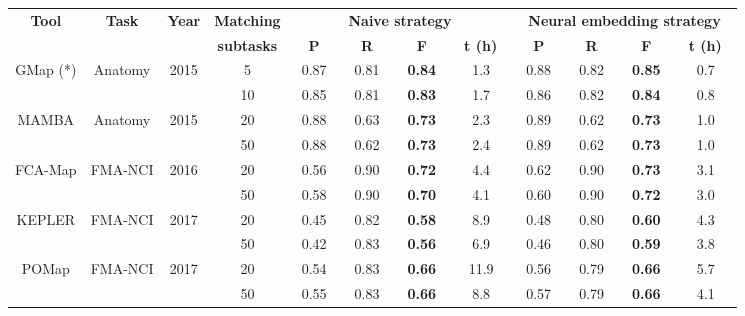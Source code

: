 {
\centering

\begin{scriptsize}
\begin{tabular}{|c|c|c|c||c|c|c|c||c|c|c|c|}
\hline

\multirow{2}{*}{\textbf{Tool}} & \multirow{2}{*}{\textbf{Task}} & 
\multirow{2}{*}{\textbf{Year}}
& 
\textbf{Matching} 
& \multicolumn{4}{c||}{\textbf{Naive
strategy}} & \multicolumn{4}{c|}{\textbf{Neural embedding
strategy}}\\\cline{5-12}

& & & \textbf{subtasks} &
~\textbf{P}~ &
~\textbf{R}~ &  ~\textbf{F}~ &  ~\textbf{t (h)~} &
~\textbf{P}~ &
~\textbf{R}~ &  ~\textbf{F}~ &  ~\textbf{t (h)~}
\\\hline\hline

\multirow{2}{*}{GMap (*)} & \multirow{2}{*}{Anatomy} & \multirow{2}{*}{2015} 
& 5 & 0.87 & 0.81 & \textbf{0.84} & 1.3 & 0.88 & 0.82 & \textbf{0.85} & 0.7\\
& & & 10 & 0.85 & 0.81 & \textbf{0.83} &	1.7 & 0.86 & 0.82 & \textbf{0.84} & 0.8
\\\hline\hline

\multirow{2}{*}{MAMBA} & \multirow{2}{*}{Anatomy} & \multirow{2}{*}{2015} & 
20 & ~0.88~ & ~0.63~ & ~\textbf{0.73}~ & 2.3 & ~0.89~ & ~0.62~ & ~\textbf{0.73}~ & 1.0  \\
& & & 50 & 0.88 & 0.62 & \textbf{0.73} & 2.4 & 0.89 & 0.62 &\textbf{ 0.73} & 1.0
\\\hline\hline


\multirow{2}{*}{FCA-Map} & \multirow{2}{*}{FMA-NCI} & \multirow{2}{*}{2016} 
& 20 & 0.56 & 0.90 & \textbf{0.72} & 4.4 &  0.62 & 0.90 & \textbf{0.73} & 3.1 \\
& & & 50 & 0.58 & 0.90 & \textbf{0.70} &	4.1 & 0.60 & 0.90 & \textbf{0.72} & 3.0 \\\hline\hline


\multirow{2}{*}{KEPLER} & \multirow{2}{*}{FMA-NCI} & \multirow{2}{*}{2017} 
& 20 & 0.45 & 0.82 & \textbf{0.58} & 8.9 & 0.48 & 0.80 &	\textbf{0.60} & 4.3\\
& & & 50 & 0.42 & 0.83 & \textbf{0.56} & 6.9 & 0.46 & 0.80 & \textbf{0.59} & 3.8
\\\hline\hline

\multirow{2}{*}{POMap} & \multirow{2}{*}{FMA-NCI} & \multirow{2}{*}{2017} 
& 20 & 0.54 & 0.83 & \textbf{0.66} &	11.9 & 0.56 & 0.79 & \textbf{0.66} & 5.7\\ 
& & & 50 & 0.55 & 0.83 & \textbf{0.66} & 8.8 & 0.57 & 0.79 & \textbf{0.66} & 4.1 \\\hline

 
\end{tabular}
\end{scriptsize}
}